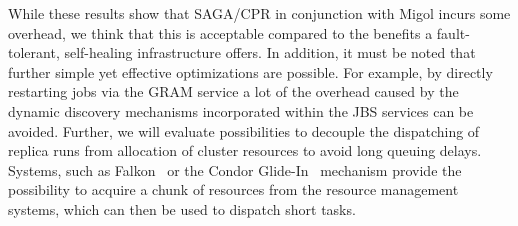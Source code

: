 \documentclass[times, 10pt, twocolumn]{article}
\newcommand{\jhanote}[1]{ {\textcolor{red} { ***SJ: #1 }}}
\newcommand{\jhanote}[1]{}
\begin{document}

While these results show that SAGA/CPR in conjunction with Migol
incurs some overhead, we think that this is acceptable compared to the
benefits a fault-tolerant, self-healing infrastructure offers. In
addition, it must be noted that further simple yet effective
optimizations are possible. For example, by directly restarting jobs
via the GRAM service a lot of the overhead caused by the dynamic
discovery mechanisms incorporated within the JBS services can
be avoided. Further, we will evaluate possibilities to decouple
the dispatching of replica runs from allocation of cluster resources 
to avoid long queuing delays. Systems, 
such as Falkon~\cite{1362680} or the Condor Glide-In~\cite{citeulike:291860} 
mechanism provide the possibility to acquire a chunk of resources 
from the resource management systems, which can
then be used to dispatch short tasks.


\end{document}

